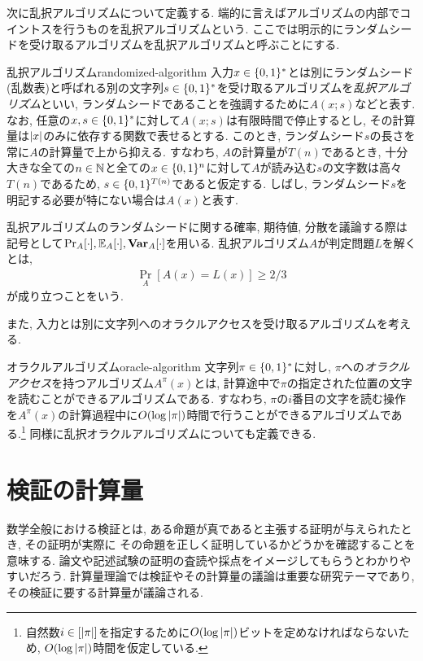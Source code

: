 次に乱択アルゴリズムについて定義する. 端的に言えばアルゴリズムの内部でコイントスを行うものを乱択アルゴリズムという.
ここでは明示的にランダムシードを受け取るアルゴリズムを乱択アルゴリズムと呼ぶことにする.

\begin{definition}{乱択アルゴリズム}{randomized-algorithm}
  入力$x\in\{0,1\}^*$とは別にランダムシード(乱数表)と呼ばれる別の文字列$s\in\{0,1\}^*$を受け取るアルゴリズムを\emph{乱択アルゴリズム}といい, ランダムシードであることを強調するために$A(x;s)$などと表す.
  なお, 任意の$x,s\in\{0,1\}^*$に対して$A(x;s)$は有限時間で停止するとし, その計算量は$\abs{x}$のみに依存する関数で表せるとする.
  このとき, ランダムシード$s$の長さを常に$A$の計算量で上から抑える.
  すなわち, $A$の計算量が$T(n)$であるとき, 十分大きな全ての$n\in\mathbb{N}$と全ての$x\in\{0,1\}^n$に対して$A$が読み込む$s$の文字数は高々$T(n)$であるため, $s\in \{0,1\}^{T(n)}$であると仮定する.
  しばし, ランダムシード$s$を明記する必要が特にない場合は$A(x)$と表す.

  乱択アルゴリズムのランダムシードに関する確率, 期待値, 分散を議論する際は記号として$\Pr_{A}[\cdot],\operatorname*{\mathbb{E}}_A[\cdot],\operatorname*{\mathbf{Var}}_A[\cdot]$を用いる.
  乱択アルゴリズム$A$が判定問題$L$を解くとは,
  \begin{align*}
    \Pr_A[A(x)=L(x)]\geq 2/3
  \end{align*}
  が成り立つことをいう.
\end{definition}

また, 入力とは別に文字列へのオラクルアクセスを受け取るアルゴリズムを考える.
\begin{definition}{オラクルアルゴリズム}{oracle-algorithm}
  文字列$\pi\in\{0,1\}^*$に対し, $\pi$への\emph{オラクルアクセス}を持つアルゴリズム$A^\pi(x)$とは, 計算途中で$\pi$の指定された位置の文字を読むことができるアルゴリズムである.
  すなわち, $\pi$の$i$番目の文字を読む操作を$A^\pi(x)$の計算過程中に$O(\log \abs{\pi})$時間で行うことができるアルゴリズムである.\footnote{自然数$i\in[\abs{\pi}]$を指定するために$O(\log \abs{\pi})$ビットを定めなければならないため, $O(\log \abs{\pi})$時間を仮定している.}
  同様に乱択オラクルアルゴリズムについても定義できる.
\end{definition}


\section{検証の計算量}
数学全般における検証とは, ある命題が真であると主張する証明が与えられたとき, その証明が実際に
その命題を正しく証明しているかどうかを確認することを意味する.
論文や記述試験の証明の査読や採点をイメージしてもらうとわかりやすいだろう.
計算量理論では検証やその計算量の議論は重要な研究テーマであり, その検証に要する計算量が議論される.

